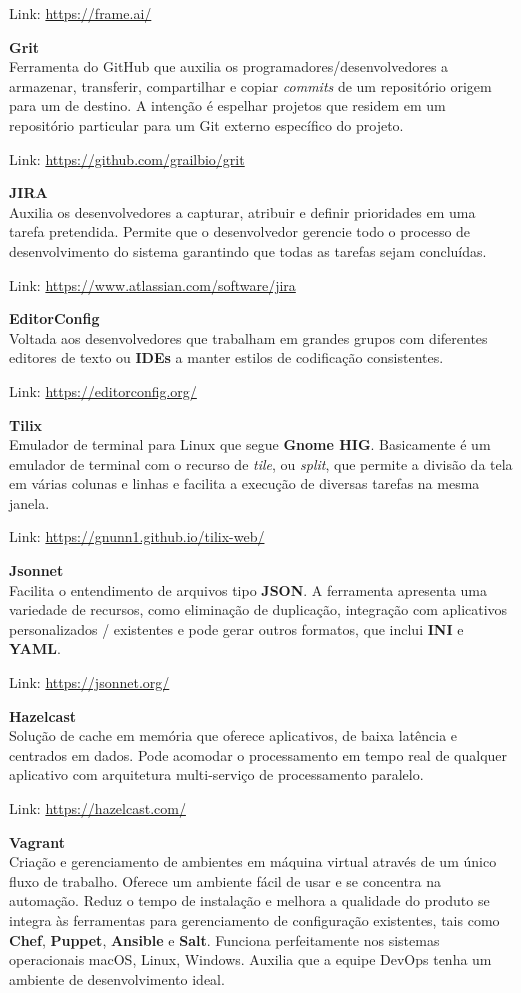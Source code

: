 \documentclass[fleqn,10pt]{SelfArx} %
\begin{document}
Link: \url{https://frame.ai/}

\textbf{Grit} \\
Ferramenta do GitHub que auxilia os programadores/desenvolvedores a armazenar, transferir, compartilhar e copiar \textit{commits} de um repositório origem para um de destino. A intenção é espelhar projetos que residem em um repositório particular para um Git externo específico do projeto.

Link: \url{https://github.com/grailbio/grit}

\textbf{JIRA} \\
Auxilia os desenvolvedores a capturar, atribuir e definir prioridades em uma tarefa pretendida. Permite que o desenvolvedor gerencie todo o processo de desenvolvimento do sistema garantindo que todas as tarefas sejam concluídas.

Link: \url{https://www.atlassian.com/software/jira}

\textbf{EditorConfig} \\
Voltada aos desenvolvedores que trabalham em grandes grupos com diferentes editores de texto ou \textbf{IDEs} a manter estilos de codificação consistentes.

Link: \url{https://editorconfig.org/}

\textbf{Tilix} \\
Emulador de terminal para Linux que segue \textbf{Gnome HIG}. Basicamente é um emulador de terminal com o recurso de \textit{tile}, ou \textit{split}, que permite a divisão da tela em várias colunas e linhas e facilita a execução de diversas tarefas na mesma janela.

Link: \url{https://gnunn1.github.io/tilix-web/}

\textbf{Jsonnet} \\
Facilita o entendimento de arquivos tipo \textbf{JSON}. A ferramenta apresenta uma variedade de recursos, como eliminação de duplicação, integração com aplicativos personalizados / existentes e pode gerar outros formatos, que inclui \textbf{INI} e \textbf{YAML}.

Link: \url{https://jsonnet.org/}

\textbf{Hazelcast} \\
Solução de cache em memória que oferece aplicativos, de baixa latência e centrados em dados. Pode acomodar o processamento em tempo real de qualquer aplicativo com arquitetura multi-serviço de processamento paralelo.

Link: \url{https://hazelcast.com/}

\textbf{Vagrant} \\
Criação e gerenciamento de ambientes em máquina virtual através de um único fluxo de trabalho. Oferece um ambiente fácil de usar e se concentra na automação. Reduz o tempo de instalação e melhora a qualidade do produto se integra às ferramentas para gerenciamento de configuração existentes, tais como \textbf{Chef}, \textbf{Puppet}, \textbf{Ansible} e \textbf{Salt}. Funciona perfeitamente nos sistemas operacionais macOS, Linux, Windows. Auxilia que a equipe DevOps tenha um ambiente de desenvolvimento ideal.
\end{document}
